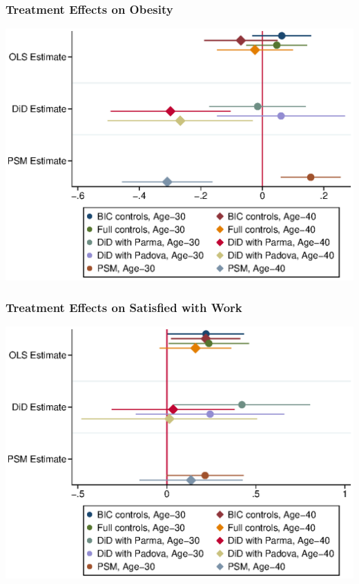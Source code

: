 \begin{frame}
	\frametitle{Treatment Effects on Obesity} 
	\includegraphics[scale=0.8]{../../../output/image/coefplot-BMI_obese-adult}

\end{frame}

\begin{frame}
	\frametitle{Treatment Effects on Satisfied with Work} 

	\includegraphics[scale=0.8]{../../../output/image/coefplot-SatisWork-adult}
\end{frame}

